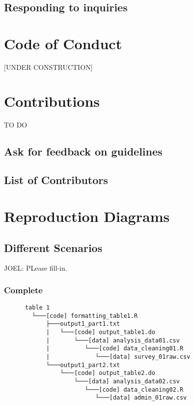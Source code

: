 \documentclass[]{book}
\begin{document}
\hypertarget{responding-to-inquiries}{%
\section{Responding to inquiries}\label{responding-to-inquiries}}

\hypertarget{code-of-conduct}{%
\chapter{Code of Conduct}\label{code-of-conduct}}

{[}UNDER CONSTRUCTION{]}

\hypertarget{contributions}{%
\chapter{Contributions}\label{contributions}}

TO DO

\hypertarget{ask-for-feedback-on-guidelines}{%
\section{Ask for feedback on guidelines}\label{ask-for-feedback-on-guidelines}}

\hypertarget{list-of-contributors}{%
\section{List of Contributors}\label{list-of-contributors}}

\hypertarget{reproduction-diagrams}{%
\chapter{Reproduction Diagrams}\label{reproduction-diagrams}}

\hypertarget{different-scenarios}{%
\section{Different Scenarios}\label{different-scenarios}}

JOEL: PLease fill-in.

\hypertarget{complete}{%
\subsection{Complete}\label{complete}}

\begin{verbatim}
      table 1
        └───[code] formatting_table1.R
            ├───output1_part1.txt  
            |   └───[code] output_table1.do           
            |       └───[data] analysis_data01.csv
            |          └───[code] data_cleaning01.R
            |             └───[data] survey_01raw.csv
            └───output1_part2.txt  
                └───[code] output_table2.do           
                    └───[data] analysis_data02.csv
                       └───[code] data_cleaning02.R
                          └───[data] admin_01raw.csv  
\end{verbatim}
\end{document}
